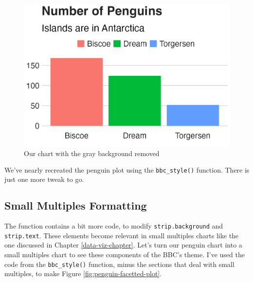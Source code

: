 \documentclass[
]{book}
\begin{document}
\begin{figure}
\includegraphics[width=1\linewidth]{custom-theme_files/figure-latex/penguins-plot-no-bg-1} \caption{Our chart with the gray background removed}\label{fig:penguins-plot-no-bg}
\end{figure}

We've nearly recreated the penguin plot using the \texttt{bbc\_style()} function. There is just one more tweak to go.

\hypertarget{small-multiples-formatting}{%
\subsection*{Small Multiples Formatting}\label{small-multiples-formatting}}

The function contains a bit more code, to modify \texttt{strip.background} and \texttt{strip.text}. These elements become relevant in small multiples charts like the one discussed in Chapter \ref{data-viz-chapter}. Let's turn our penguin chart into a small multiples chart to see these components of the BBC's theme. I've used the code from the \texttt{bbc\_style()} function, minus the sections that deal with small multiples, to make Figure \ref{fig:penguin-facetted-plot}.
\end{document}
